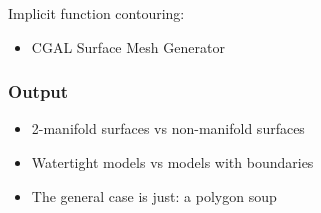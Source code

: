 Implicit function contouring:

\begin{itemize}
\item CGAL Surface Mesh Generator~\cite{cgal:ry-gsddrm-06,cgal:bo-pgsms-05}
\end{itemize}


\subsubsection{Output}

\begin{itemize}
\item 2-manifold surfaces vs non-manifold surfaces
\item Watertight models vs models with boundaries
\item The general case is just: a polygon soup
\end{itemize}



